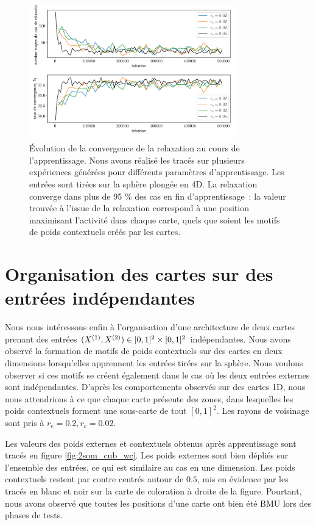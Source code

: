 \documentclass[../main]{subfiles}
\begin{document}
\begin{figure}
	\centering
	\includegraphics[width=0.8\textwidth]{conv_relax_2maps.pdf}
	\vspace{-0.5cm}
	\caption{\'Evolution de la convergence de la relaxation au cours de l'apprentissage. Nous avons réalisé les tracés sur plusieurs expériences générées pour différents paramètres d'apprentissage. Les entrées sont tirées sur la sphère plongée en 4D. 
	La relaxation converge dans plus de 95 \% des cas en fin d'apprentissage~: la valeur trouvée à l'issue de la relaxation correspond à une position maximisant l'activité dans chaque carte, quels que soient les motifs de poids contextuels créés par les cartes. \label{fig:relax2D}}
\end{figure}

\section{Organisation des cartes sur des entrées indépendantes \label{par:cub2D}}

Nous nous intéressons enfin à l'organisation d'une architecture de deux cartes prenant des entrées $(X^{({1})}, X^{({2})}) \in [0,1]^2 \times [0,1]^2$ indépendantes.
Nous avons observé la formation de motifs de poids contextuels sur des cartes en deux dimensions lorsqu'elles apprennent les entrées tirées sur la sphère. Nous voulons observer si ces motifs se créent également dans le cas où les deux entrées externes sont indépendantes.
D'après les comportements observés sur des cartes 1D, nous nous attendrions à ce que chaque carte présente des zones, dans lesquelles les poids contextuels forment une sous-carte de tout $[0,1]^2$.
Les rayons de voisinage sont pris à $r_e = 0.2, r_c = 0.02$.

Les valeurs des poids externes et contextuels obtenus après apprentissage sont tracés en figure \ref{fig:2som_cub_wc}.
Les poids externes sont bien dépliés sur l'ensemble des entrées, ce qui est similaire au cas en une dimension.
Les poids contextuels restent par contre centrés autour de $0.5$, mis en évidence par les tracés en blanc et noir sur la carte de coloration à droite de la figure.
Pourtant, nous avons observé que toutes les positions d'une carte ont bien été BMU lors des phases de tests.
\end{document}
